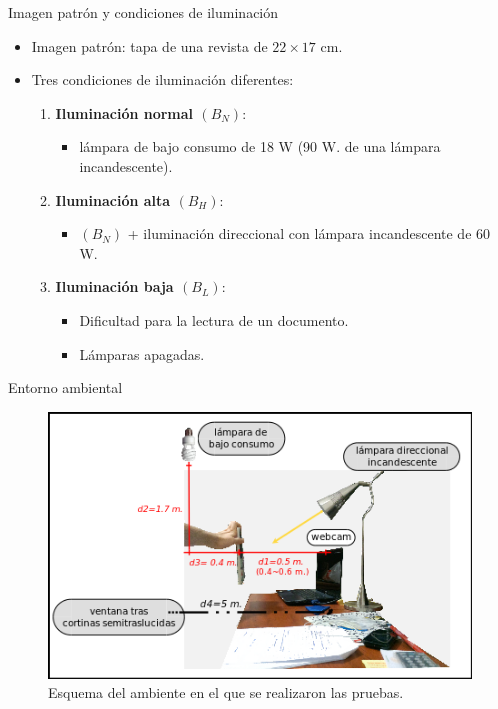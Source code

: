     \begin{frame}{Imagen patrón y condiciones de iluminación}
      \begin{itemize}
	\item Imagen patrón: tapa de una revista de $22 \times 17$ cm.
	\item Tres condiciones de iluminación diferentes:
	\begin{enumerate}
	  \item<1-> \textbf{Iluminación normal $(B_{N})$}: 
		\begin{itemize}
		  \item lámpara de bajo consumo de 18 W (90 W. de una lámpara incandescente).
		\end{itemize}
    
	  \item<2-> \textbf{Iluminación alta $(B_{H})$}: 
		  \begin{itemize}
		  \item $(B_{N})$ + iluminación direccional con lámpara incandescente de 60 W.
		  \end{itemize}
	      
	  \item<3-> \textbf{Iluminación baja $(B_{L})$}:
		  \begin{itemize}
		    \item Dificultad para la lectura de un documento.
		    \item Lámparas apagadas.
		  \end{itemize}  
	\end{enumerate}
      \end{itemize}
    \end{frame}
  
  \begin{frame}{Entorno ambiental}
      \begin{figure}[tbhp]
	\centering
	      \includegraphics[scale=0.45]{../../figs/entorno/entorno_pruebas_slide}
	  \caption*{Esquema del ambiente en el que se realizaron las pruebas.}
	\label{fig:entorno_pruebas}
      \end{figure}
  \end{frame}
    
